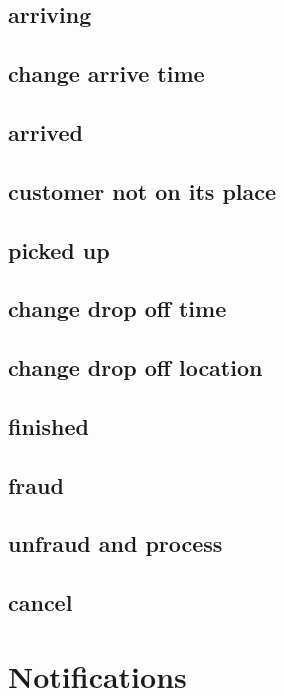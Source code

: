 		\subsection{arriving}
		\subsection{change arrive time}
		\subsection{arrived}
		\subsection{customer not on its place}
		\subsection{picked up}
		\subsection{change drop off time}
		\subsection{change drop off location}
		\subsection{finished}
		\subsection{fraud}
		\subsection{unfraud and process}
		\subsection{cancel}
	
	\section{Notifications}

